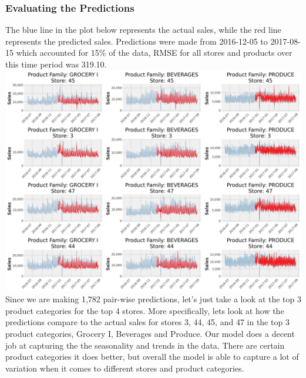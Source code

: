 \documentclass[12pt]{article}
\begin{document}
\subsubsection{Evaluating the Predictions}
The blue line in the plot below represents the actual sales, while the red line represents the predicted sales. Predictions were made from 2016-12-05 to 2017-08-15 which accounted for 15\% of the data, RMSE for all stores and products over this time period was 319.10.
\includegraphics[width=\textwidth]{figures/XGBoost.png}
Since we are making 1,782 pair-wise predictions, let's just take a look at the top 3 product categories for the top 4 stores.
More specifically, lets look at how the predictions compare to the actual sales for stores 3, 44, 45, and 47 in the top 3 product categories, Grocery I, Beverages and Produce.
Our model does a decent job at capturing the the seasonality and trends in the data. 
There are certain product categories it does better, but overall the model is able to capture a lot of variation when it comes to different stores and product categories.
\end{document}
